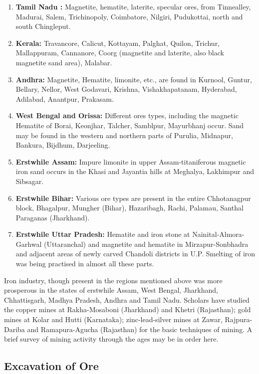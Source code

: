\begin{enumerate}
\item {\bf Tamil Nadu :} Magnetite, hematite, laterite, specular ores, from Tinnealley, Madurai, Salem, Trichinopoly, Coimbatore, Nilgiri, Pudukottai, north and south Chingleput.
\item {\bf Kerala:} Travancore, Calicut, Kottayam, Palghat, Quilon, Trichur, Mallappuram, Cannanore, Coorg (magnetite and laterite, also black magnetite sand area), Malabar.
\item {\bf Andhra:} Magnetite, Hematite, limonite, etc., are found in Kurnool, Guntur, Bellary, Nellor, West Godavari, Krishna, Vishakhapatanam, Hyderabad, Adilabad, Anantpur, Prakasam.
\item {\bf West Bengal and Orissa:} Different ores types, including the magnetic Hematite of Borai, Keonjhar, Talcher, Samblpur, Mayurbhanj occur. Sand may be found in the western and northern parts of Purulia, Midnapur, Bankura, Bijdhum, Darjeeling.
\item {\bf Erstwhile Assam:} Impure limonite in upper Assam-titaniferous magnetic iron sand occurs in the Khasi and Jayantia hills at Meghalya, Lakhimpur and Sibsagar.
\item {\bf Erstwhile Bihar:} Various ore types are present in the entire Chhotanagpur block, Bhagalpur, Mungher (Bihar), Hazaribagh, Rachi, Palamau, Santhal Paraganas (Jharkhand).
\item {\bf Erstwhile Uttar Pradesh:} Hematite and iron stone at Nainital-Almora-Garhwal (Uttaranchal) and magnetite and hematite in Mirzapur-Sonbhadra and adjacent areas of newly carved Chandoli districts in U.P. Smelting of iron was being practised in almost all these parts.
\end{enumerate}

\vspace{-.2cm}

Iron industry, though present in the regions mentioned above was more prosperous in the states of erstwhile Assam, West Bengal, Jharkhand, Chhattisgarh, Madhya Pradesh, Andhra and Tamil Nadu. Scholars have studied the copper mines at Rakha-Mosaboni (Jharkhand) and Khetri (Rajasthan); gold mines at Kolar and Hutti (Karnataka); zinc-lead-silver mines at Zawar, Rajpura-Dariba and Ramapura-Agucha (Rajasthan) for the basic techniques of mining. A brief survey of mining activity through the ages may be in order here.  

\vspace{-.3cm}

\subsection*{Excavation of Ore}

